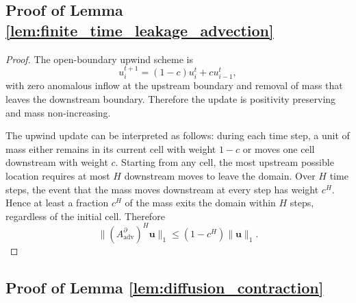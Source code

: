 \subsection{Proof of Lemma \ref{lem:finite_time_leakage_advection}}
\label{sec:proof_finite_time_leakage_advection}
\begin{proof}
The open-boundary upwind scheme is
\[
u_i^{t+1} = (1-c)u_i^t + c u_{i-1}^t,
\]
with zero anomalous inflow at the upstream boundary and removal of mass
that leaves the downstream boundary. Therefore the update is
positivity preserving and mass non-increasing.

The upwind update can be interpreted as follows: during each time step,
a unit of mass either remains in its current cell with weight \(1-c\) or
moves one cell downstream with weight \(c\). Starting from any cell, the
most upstream possible location requires at most \(H\) downstream moves
to leave the domain. Over \(H\) time steps, the event that the mass moves
downstream at every step has weight \(c^H\). Hence at least a fraction
\(c^H\) of the mass exits the domain within \(H\) steps, regardless of
the initial cell. Therefore
\[
\|(A_{\mathrm{adv}}^{\partial})^H\mathbf{u}\|_1
\le
(1-c^H)\|\mathbf{u}\|_1.
\]
\end{proof}


\subsection{Proof of Lemma \ref{lem:diffusion_contraction}}
\label{sec:proof_diffusion_contraction}



